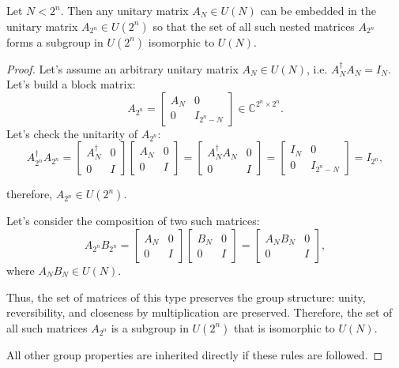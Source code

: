 \documentclass[10pt,a4paper]{amsart}
\begin{document}
\begin{lemma}
Let $N < 2^n$. Then any unitary matrix $A_N\in U(N)$ can be embedded in the unitary matrix $A_{2^n}\in U(2^n)$ so that the set of all such nested matrices $A_{2^n}$ forms a subgroup in $U(2^n)$ isomorphic to $U(N)$.
\end{lemma}

\begin{proof}
Let's assume an arbitrary unitary matrix $A_N\in U(N)$, i.e. $A_N^\dagger A_N=I_N$. Let's build a block matrix:
\begin{equation}
    A_{2^n} = \begin{bmatrix}
        A_N & 0 \\
        0 & I_{2^n - N}
    \end{bmatrix} \in \mathbb{C}^{2^n \times 2^n}.
\end{equation}
Let's check the unitarity of $A_{2^n}$:
\begin{equation}
A_{2^n}^\dagger A_{2^n} =
\begin{bmatrix}
    A_N^\dagger & 0 \\
    0 & I
\end{bmatrix}
\begin{bmatrix}
    A_N & 0 \\
    0 & I
\end{bmatrix}
=
\begin{bmatrix}
    A_N^\dagger A_N & 0 \\
    0 & I
\end{bmatrix}
=
\begin{bmatrix}
    I_N & 0 \\
    0 & I_{2^n - N}
\end{bmatrix}
= I_{2^n},
\end{equation}



therefore, $A_{2^n} \in U(2^n)$.

Let's consider the composition of two such matrices:
\begin{equation}
    A_{2^n}B_{2^n} = 
    \begin{bmatrix}
        A_N & 0 \\
        0 & I
    \end{bmatrix}
    \begin{bmatrix}
        B_N & 0 \\
        0 & I
    \end{bmatrix}
    =
    \begin{bmatrix}
        A_NB_N & 0 \\
        0 & I
    \end{bmatrix},
\end{equation}
where $A_NB_N \in U(N)$.

Thus, the set of matrices of this type preserves the group structure: unity, reversibility, and closeness by multiplication are preserved. Therefore, the set of all such matrices $A_{2^n}$ is a subgroup in $U(2^n)$ that is isomorphic to $U(N)$.

All other group properties are inherited directly if these rules are followed.
\end{proof}
\end{document}
